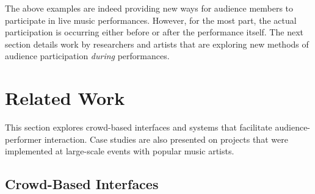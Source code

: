 
The above examples are indeed providing new ways for audience members to participate in live music performances. However, for the most part, the actual participation is occurring either before or after the performance itself. The next section details work by researchers and artists that are exploring new methods of audience participation \textit{during} performances.


\section{Related Work}

This section explores crowd-based interfaces and systems that facilitate audience-performer interaction. Case studies are also presented on projects that were implemented at large-scale events with popular music artists.

\subsection{Crowd-Based Interfaces}

